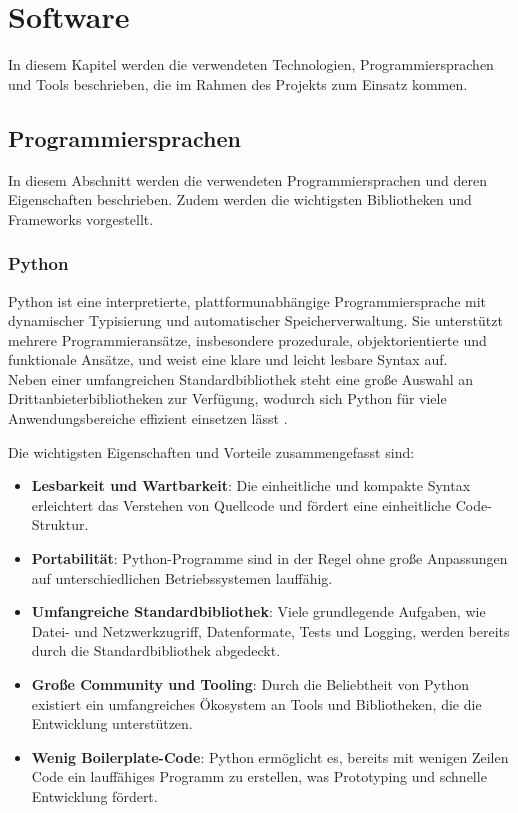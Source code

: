 \chapter{Software}
\label{chap:architektur}
In diesem Kapitel werden die verwendeten Technologien, Programmiersprachen und Tools beschrieben, die im Rahmen des Projekts zum Einsatz kommen.


\section{Programmiersprachen}
In diesem Abschnitt werden die verwendeten Programmiersprachen und deren Eigenschaften beschrieben. Zudem werden die wichtigsten Bibliotheken und Frameworks vorgestellt.
    \subsection{Python}
    Python ist eine interpretierte, plattformunabhängige Programmiersprache mit dynamischer Typisierung und automatischer Speicherverwaltung. Sie unterstützt mehrere Programmieransätze, insbesondere prozedurale, objektorientierte und funktionale Ansätze, und weist eine klare und leicht lesbare Syntax auf. \\
    Neben einer umfangreichen Standardbibliothek steht eine große Auswahl an Drittanbieterbibliotheken zur Verfügung, wodurch sich Python für viele Anwendungsbereiche effizient einsetzen lässt \cite{PythonTutorial}.

    Die wichtigsten Eigenschaften und Vorteile zusammengefasst sind:
    \begin{itemize}
        \item \textbf{Lesbarkeit und Wartbarkeit}: Die einheitliche und kompakte Syntax erleichtert das Verstehen von Quellcode und fördert eine einheitliche Code-Struktur.
        \item \textbf{Portabilität}: Python-Programme sind in der Regel ohne große Anpassungen auf unterschiedlichen Betriebssystemen lauffähig.
        \item \textbf{Umfangreiche Standardbibliothek}: Viele grundlegende Aufgaben, wie Datei- und Netzwerkzugriff, Datenformate, Tests und Logging, werden bereits durch die Standardbibliothek abgedeckt.
        \item \textbf{Große Community und Tooling}: Durch die Beliebtheit von Python existiert ein umfangreiches Ökosystem an Tools und Bibliotheken, die die Entwicklung unterstützen.
        \item \textbf{Wenig Boilerplate-Code}: Python ermöglicht es, bereits mit wenigen Zeilen Code ein lauffähiges Programm zu erstellen, was Prototyping und schnelle Entwicklung fördert.
    \end{itemize}

